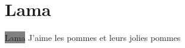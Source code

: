 \documentclass[11pt]{article}
\begin{document}
\section{Lama}
\colorbox{gray}{Lama}
\lipsum
J'aime les pommes et leurs jolies pommes
\end{document}
